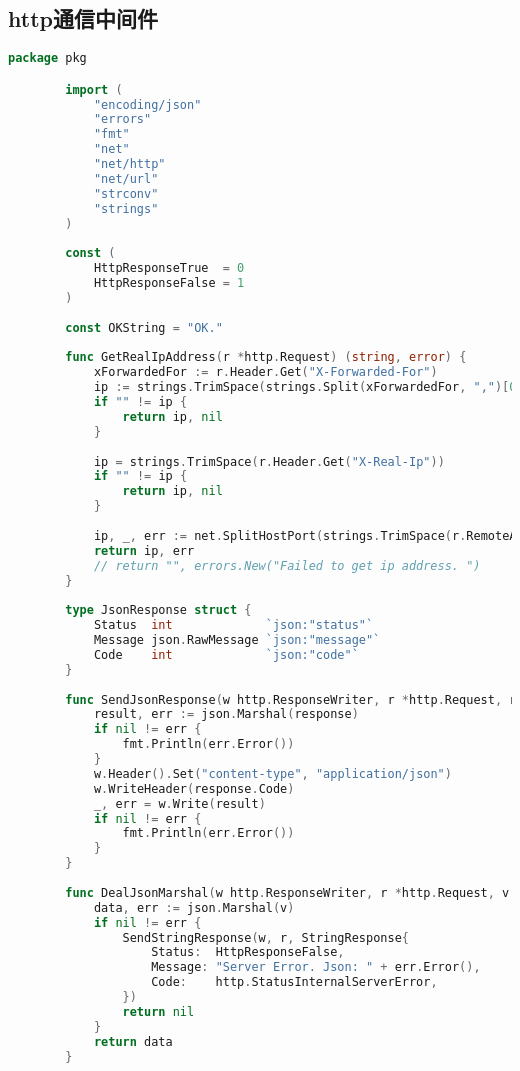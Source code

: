 \documentclass[UTF8]{ctexart}
\begin{document}
    \subsection{http通信中间件}
    \begin{lstlisting}[language=go]
        package pkg

        import (
            "encoding/json"
            "errors"
            "fmt"
            "net"
            "net/http"
            "net/url"
            "strconv"
            "strings"
        )
        
        const (
            HttpResponseTrue  = 0
            HttpResponseFalse = 1
        )
        
        const OKString = "OK."
        
        func GetRealIpAddress(r *http.Request) (string, error) {
            xForwardedFor := r.Header.Get("X-Forwarded-For")
            ip := strings.TrimSpace(strings.Split(xForwardedFor, ",")[0])
            if "" != ip {
                return ip, nil
            }
        
            ip = strings.TrimSpace(r.Header.Get("X-Real-Ip"))
            if "" != ip {
                return ip, nil
            }
        
            ip, _, err := net.SplitHostPort(strings.TrimSpace(r.RemoteAddr))
            return ip, err
            // return "", errors.New("Failed to get ip address. ")
        }
        
        type JsonResponse struct {
            Status  int             `json:"status"`
            Message json.RawMessage `json:"message"`
            Code    int             `json:"code"`
        }
        
        func SendJsonResponse(w http.ResponseWriter, r *http.Request, response JsonResponse) {
            result, err := json.Marshal(response)
            if nil != err {
                fmt.Println(err.Error())
            }
            w.Header().Set("content-type", "application/json")
            w.WriteHeader(response.Code)
            _, err = w.Write(result)
            if nil != err {
                fmt.Println(err.Error())
            }
        }
        
        func DealJsonMarshal(w http.ResponseWriter, r *http.Request, v interface{}) []byte {
            data, err := json.Marshal(v)
            if nil != err {
                SendStringResponse(w, r, StringResponse{
                    Status:  HttpResponseFalse,
                    Message: "Server Error. Json: " + err.Error(),
                    Code:    http.StatusInternalServerError,
                })
                return nil
            }
            return data
        }
        

\end{lstlisting}
\end{document}
